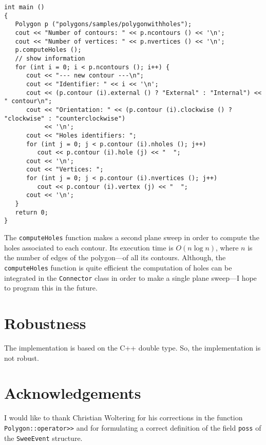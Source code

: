 \documentclass[a4paper]{article}
\begin{document}
\begin{lstlisting}
int main ()
{
   Polygon p ("polygons/samples/polygonwithholes");
   cout << "Number of contours: " << p.ncontours () << '\n';
   cout << "Number of vertices: " << p.nvertices () << '\n';
   p.computeHoles ();
   // show information
   for (int i = 0; i < p.ncontours (); i++) {
      cout << "--- new contour ---\n";
      cout << "Identifier: " << i << '\n';
      cout << (p.contour (i).external () ? "External" : "Internal") << " contour\n";
      cout << "Orientation: " << (p.contour (i).clockwise () ? "clockwise" : "counterclockwise") 
           << '\n';
      cout << "Holes identifiers: ";
      for (int j = 0; j < p.contour (i).nholes (); j++)
         cout << p.contour (i).hole (j) << "  ";
      cout << '\n';
      cout << "Vertices: ";
      for (int j = 0; j < p.contour (i).nvertices (); j++)
         cout << p.contour (i).vertex (j) << "  ";
      cout << '\n';
   }
   return 0;
}
\end{lstlisting}

The \lstinline+computeHoles+ function makes a second plane sweep in order to compute the holes associated to each contour. Its execution time is $O(n \log n)$, where $n$
is the number of edges of the polygon---of all its contours. Although, the \lstinline+computeHoles+ function is quite efficient the computation of holes can be
integrated in the \lstinline+Connector+ class in order to make a single plane sweep---I hope to program this in the future.

%
%

\section{Robustness}

The implementation is based on the C++ double type. So, the implementation is not robust.


\section{Acknowledgements}

I would like to thank Christian Woltering for his corrections in the function \lstinline+Polygon::operator>>+ and for formulating a correct
definition of the field \lstinline+poss+ of the \lstinline+SweeEvent+ structure.
\end{document}
